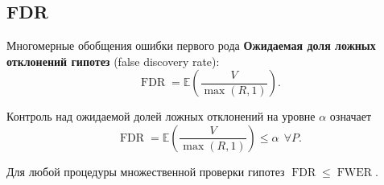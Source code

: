 \documentclass[9pt,pdf,utf8,hyperref={unicode},aspectratio=169]{beamer}
\renewcommand{\leq}{\leqslant}
\DeclareMathOperator{\FWER}{FWER}
\DeclareMathOperator{\FDR}{FDR}
\begin{document}
\subsection{FDR}
\begin{frame}{Многомерные обобщения ошибки первого рода}
    \textbf{Ожидаемая доля ложных отклонений гипотез} (false discovery rate):
    $$\FDR = \mathbb{E}\left(\frac{V}{\max\left(R,1\right)}\right).$$

    \bigskip

    Контроль над ожидаемой долей ложных отклонений на уровне $\alpha$ означает $$\FDR = \mathbb{E}\left(\frac{V}{\max\left(R,1\right)}\right) \leq \alpha ~~\forall P.$$

    \bigskip

    Для любой процедуры множественной проверки гипотез $\FDR\leq \FWER.$
\end{frame}
\end{document}
